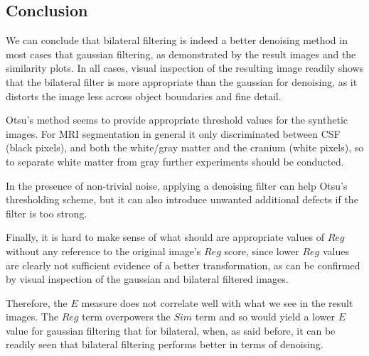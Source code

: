 \subsection{Conclusion}

We can conclude that bilateral filtering is indeed a better denoising method in most cases that gaussian filtering, as demonstrated by the result images and the similarity plots. In all cases, visual inspection of the resulting image readily shows that the bilateral filter is more appropriate than the gaussian for denoising, as it distorts the image less across object boundaries and fine detail. 

Otsu's method seems to provide appropriate threshold values for the synthetic images. For MRI segmentation in general it only discriminated between CSF (black pixels), and both the white/gray matter and the cranium (white pixels), so to separate white matter from gray further experiments should be conducted. 

In the presence of non-trivial noise, applying a denoising filter can help Otsu's thresholding scheme, but it can also introduce unwanted additional defects if the filter is too strong.

Finally, it is hard to make sense of what should are appropriate values of $Reg$ without any reference to the original image's $Reg$ score, since lower $Reg$ values are clearly not sufficient evidence of a better transformation, as can be confirmed by visual inspection of the gaussian and bilateral filtered images. 

Therefore, the $E$ measure does not correlate well with what we see in the result images. The $Reg$ term overpowers the $Sim$ term and so would yield a lower $E$ value for gaussian filtering that for bilateral, when, as said before, it can be readily seen that bilateral filtering performs better in terms of denoising. 

